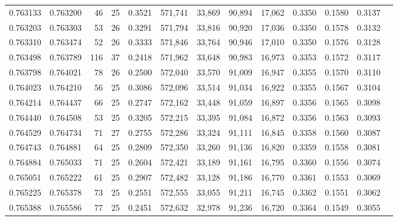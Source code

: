 \begin{tabular}{rrrrrrrrrrrrr}
0.763133 & 0.763200 &    46 &  25 &                                     0.3521 & 571,741 &  33,869 &  90,894 &  17,062 & 0.3350 & 0.1580 & 0.3137 \\
0.763203 & 0.763303 &    53 &  26 &                                     0.3291 & 571,794 &  33,816 &  90,920 &  17,036 & 0.3350 & 0.1578 & 0.3132 \\
0.763310 & 0.763474 &    52 &  26 &                                     0.3333 & 571,846 &  33,764 &  90,946 &  17,010 & 0.3350 & 0.1576 & 0.3128 \\
0.763498 & 0.763789 &   116 &  37 &                                     0.2418 & 571,962 &  33,648 &  90,983 &  16,973 & 0.3353 & 0.1572 & 0.3117 \\
0.763798 & 0.764021 &    78 &  26 &                                     0.2500 & 572,040 &  33,570 &  91,009 &  16,947 & 0.3355 & 0.1570 & 0.3110 \\
0.764023 & 0.764210 &    56 &  25 &                                     0.3086 & 572,096 &  33,514 &  91,034 &  16,922 & 0.3355 & 0.1567 & 0.3104 \\
0.764214 & 0.764437 &    66 &  25 &                                     0.2747 & 572,162 &  33,448 &  91,059 &  16,897 & 0.3356 & 0.1565 & 0.3098 \\
0.764440 & 0.764508 &    53 &  25 &                                     0.3205 & 572,215 &  33,395 &  91,084 &  16,872 & 0.3356 & 0.1563 & 0.3093 \\
0.764529 & 0.764734 &    71 &  27 &                                     0.2755 & 572,286 &  33,324 &  91,111 &  16,845 & 0.3358 & 0.1560 & 0.3087 \\
0.764743 & 0.764881 &    64 &  25 &                                     0.2809 & 572,350 &  33,260 &  91,136 &  16,820 & 0.3359 & 0.1558 & 0.3081 \\
0.764884 & 0.765033 &    71 &  25 &                                     0.2604 & 572,421 &  33,189 &  91,161 &  16,795 & 0.3360 & 0.1556 & 0.3074 \\
0.765051 & 0.765222 &    61 &  25 &                                     0.2907 & 572,482 &  33,128 &  91,186 &  16,770 & 0.3361 & 0.1553 & 0.3069 \\
0.765225 & 0.765378 &    73 &  25 &                                     0.2551 & 572,555 &  33,055 &  91,211 &  16,745 & 0.3362 & 0.1551 & 0.3062 \\
0.765388 & 0.765586 &    77 &  25 &                                     0.2451 & 572,632 &  32,978 &  91,236 &  16,720 & 0.3364 & 0.1549 & 0.3055 \\

\end{tabular}
